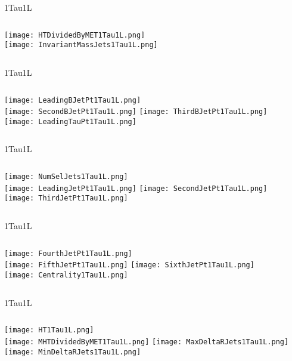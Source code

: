 \documentclass{beamer}
\begin{document}
\begin{frame}{1Tau1L}
    \begin{columns}[t]
    \centering
    \texttt{[image: HTDividedByMET1Tau1L.png]}\\
    \centering
    \texttt{[image: InvariantMassJets1Tau1L.png]}
    \end{columns}
\end{frame}
\begin{frame}{1Tau1L}
    \begin{columns}[t]
    \centering
    \texttt{[image: LeadingBJetPt1Tau1L.png]}\\
    \texttt{[image: SecondBJetPt1Tau1L.png]}
    \centering
    \texttt{[image: ThirdBJetPt1Tau1L.png]}\\
    \texttt{[image: LeadingTauPt1Tau1L.png]}
    \end{columns}
\end{frame}
\begin{frame}{1Tau1L}
    \begin{columns}[t]
    \centering
    \texttt{[image: NumSelJets1Tau1L.png]}\\
    \texttt{[image: LeadingJetPt1Tau1L.png]}
    \centering
    \texttt{[image: SecondJetPt1Tau1L.png]}\\
    \texttt{[image: ThirdJetPt1Tau1L.png]}
    \end{columns}
\end{frame}
\begin{frame}{1Tau1L}
    \begin{columns}[t]
    \centering
    \texttt{[image: FourthJetPt1Tau1L.png]}\\
    \texttt{[image: FifthJetPt1Tau1L.png]}
    \centering
    \texttt{[image: SixthJetPt1Tau1L.png]}\\
    \texttt{[image: Centrality1Tau1L.png]}
    \end{columns}
\end{frame}
\begin{frame}{1Tau1L}
    \begin{columns}[t]
    \centering
    \texttt{[image: HT1Tau1L.png]}\\
    \texttt{[image: MHTDividedByMET1Tau1L.png]}
    \centering
    \texttt{[image: MaxDeltaRJets1Tau1L.png]}\\
    \texttt{[image: MinDeltaRJets1Tau1L.png]}
    \end{columns}
\end{frame}
\end{document}
